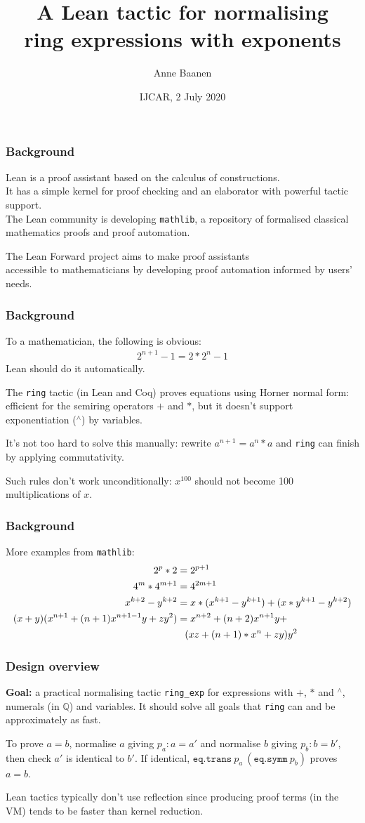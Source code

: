 \documentclass{beamer}
\title{A Lean tactic for normalising\\ ring expressions with exponents}
\author{Anne Baanen}
\institute{\vspace{-\baselineskip}Lean Forward\\Vrije Universiteit Amsterdam}
\date{\vspace{-\baselineskip}IJCAR, 2 July 2020}
\newcommand{\Q}{\mathbb{Q}}
\newcommand{\lean}[1]{\texttt{#1}\xspace} %
\newcommand{\pow}{{\ensuremath{{}^\wedge}}\xspace}
\newcommand{\ring}{\lean{ring}}
\newcommand{\ringexp}{\lean{ring\_exp}}
\begin{document}
\frame{\titlepage}

\begin{frame} \frametitle{Background}
	Lean is a proof assistant based on the calculus of constructions.\\
	It has a simple kernel for proof checking and an elaborator with powerful tactic support.\\
	The Lean community is developing \texttt{mathlib},
	a repository of formalised classical mathematics proofs and proof automation.

	The Lean Forward project aims to make proof assistants\\
	accessible to mathematicians by developing proof automation informed by users' needs.
\end{frame}

\begin{frame} \frametitle{Background}
	To a mathematician, the following is obvious:
	\begin{align*}
		2^{n+1} - 1 = 2 * 2^n - 1
	\end{align*}
	Lean should do it automatically.

	The \ring tactic (in Lean and Coq) proves equations using Horner normal form: efficient for the semiring operators $+$ and $*$,
	but it doesn't support exponentiation ($\pow$) by variables.

\pause
	It's not too hard to solve this manually:
	rewrite $a^{n + 1} = a^n * a$ and \ring can finish by applying commutativity.

	Such rules don't work unconditionally: $x^{100}$ should not become 100 multiplications of $x$.
\end{frame}

\begin{frame} \frametitle{Background}
More examples from \lean{mathlib}:
{\small\begin{align*}
	2^p * 2 &= 2^{p+1}\\
	4 ^ m * 4 ^ {m + 1} &= 4 ^ {2m + 1}\\
	x ^ {k + 2} - y ^ {k + 2} &= x * (x ^ {k + 1} - y ^ {k + 1}) + (x * y ^ {k + 1} - y ^ {k + 2}) \\
	(x + y) (x ^ {n + 1} + (n + 1) x ^ {n + 1 - 1} y + z y ^ 2) &= x ^ {n + 2} +(n + 2) x ^ {n + 1} y +\\ &\hphantom{=} (xz + (n + 1) * x ^ n + zy) y ^ 2
\end{align*}}
\end{frame}

\begin{frame} \frametitle{Design overview}
	\textbf{Goal:} a practical normalising tactic \ringexp for expressions with $+$, $*$ and \pow, numerals (in $\Q$) and variables.
	It should solve all goals that \ring can and be approximately as fast.

\pause
	To prove $a = b$, normalise $a$ giving $p_a : a = a'$ and normalise $b$ giving $p_b : b = b'$, then check $a'$ is identical to $b'$.
	If identical, $\lean{eq.trans}\ p_a\ (\lean{eq.symm}\ p_b)$ proves $a = b$.

	Lean tactics typically don't use reflection since producing proof terms (in the VM) tends to be faster than kernel reduction.
\end{frame}
\end{document}

